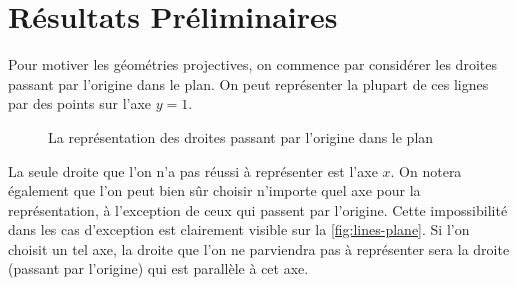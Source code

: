 \documentclass[12pt, oneside]{memoir}
\theoremstyle{definition}
\begin{document}
\section*{Résultats Préliminaires}
Pour motiver les géométries projectives, on commence par considérer
les droites passant par l'origine dans le plan. On peut représenter la
plupart de ces lignes par des points sur l'axe $y=1$.
\begin{figure}[H]
  \centering
  \caption{La représentation des droites passant par l'origine dans le
    plan}
  \label{fig:lines-plane}
\end{figure}
La seule droite que l'on n'a pas réussi à représenter est l'axe
$x$. On notera également que l'on peut bien sûr choisir n'importe quel
axe pour la représentation, à l'exception de ceux qui passent par
l'origine. Cette impossibilité dans les cas d'exception est clairement
visible sur la \autoref{fig:lines-plane}. Si l'on choisit un tel axe,
la droite que l'on ne parviendra pas à représenter sera la droite
(passant par l'origine) qui est parallèle à cet axe.
\end{document}
